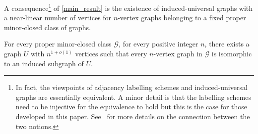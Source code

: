 \documentclass{patmorin}
\newcommand{\david}[1]{\noindent{\color{orange} DW: #1}}
\newcommand{\vida}[1]{\noindent{\color{pink} VD: #1}}
\newcommand{\pat}[1]{\noindent\textcolor{Magenta}{PaMo: #1}}
\newcommand{\gwen}[1]{\noindent\textcolor{Purple}{GJ: #1}}
\newcommand{\piotr}[1]{\noindent\textcolor{red}{PiMi: #1}}
\newcommand{\calG}{\mathcal{G}}
\begin{document}


A consequence\footnote{In fact, the viewpoints of adjacency labelling schemes and induced-universal graphs are essentially equivalent. A minor detail is that the labelling schemes need to be injective for the equivalence to hold but this is the case for those developed in this paper. See~\cite[Section~2.1]{spinrad:efficient} for more details on the connection between the two notions.} of \cref{main_result} is the existence of induced-universal graphs with a near-linear number of vertices for $n$-vertex graphs belonging to a fixed proper minor-closed class of graphs.

\begin{cor}
    For every proper minor-closed class $\calG$, for every positive integer $n$,
there exists a graph $U$ with $n^{1+o(1)}$ vertices such that every $n$-vertex graph in $\calG$ is isomorphic to an induced subgraph of $U$.
\end{cor}

\end{document}

